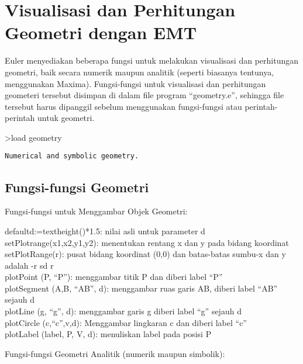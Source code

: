 \documentclass[
]{book}
\author{}
\date{}
\begin{document}
\frontmatter

\mainmatter
\chapter{Visualisasi dan Perhitungan Geometri dengan EMT}\label{visualisasi-dan-perhitungan-geometri-dengan-emt}

Euler menyediakan beberapa fungsi untuk melakukan visualisasi dan perhitungan geometri, baik secara numerik maupun analitik (seperti biasanya tentunya, menggunakan Maxima). Fungsi-fungsi untuk visualisasi dan perhitungan geometeri tersebut disimpan di dalam file program ``geometry.e'', sehingga file tersebut harus dipanggil sebelum menggunakan fungsi-fungsi atau perintah-perintah untuk geometri.

\textgreater load geometry

\begin{verbatim}
Numerical and symbolic geometry.
\end{verbatim}

\section{Fungsi-fungsi Geometri}\label{fungsi-fungsi-geometri}

Fungsi-fungsi untuk Menggambar Objek Geometri:

defaultd:=textheight()*1.5: nilai asli untuk parameter d\\
setPlotrange(x1,x2,y1,y2): menentukan rentang x dan y pada bidang koordinat\\
setPlotRange(r): pusat bidang koordinat (0,0) dan batas-batas sumbu-x dan y adalah -r sd r\\
plotPoint (P, ``P''): menggambar titik P dan diberi label ``P''\\
plotSegment (A,B, ``AB'', d): menggambar ruas garis AB, diberi label ``AB'' sejauh d\\
plotLine (g, ``g'', d): menggambar garis g diberi label ``g'' sejauh d\\
plotCircle (c,``c'',v,d): Menggambar lingkaran c dan diberi label ``c''\\
plotLabel (label, P, V, d): menuliskan label pada posisi P

Fungsi-fungsi Geometri Analitik (numerik maupun simbolik):
\end{document}
